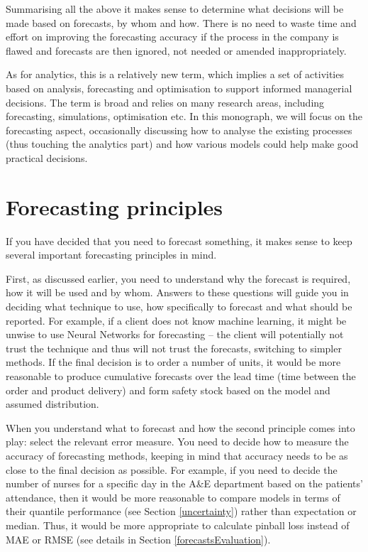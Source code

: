 \documentclass[
]{book}
\theoremstyle{definition}
\theoremstyle{definition}
\theoremstyle{definition}
\theoremstyle{definition}
\theoremstyle{remark}
\begin{document}
Summarising all the above it makes sense to determine what decisions will be made based on forecasts, by whom and how. There is no need to waste time and effort on improving the forecasting accuracy if the process in the company is flawed and forecasts are then ignored, not needed or amended inappropriately.

As for analytics, this is a relatively new term, which implies a set of activities based on analysis, forecasting and optimisation to support informed managerial decisions. The term is broad and relies on many research areas, including forecasting, simulations, optimisation etc. In this monograph, we will focus on the forecasting aspect, occasionally discussing how to analyse the existing processes (thus touching the analytics part) and how various models could help make good practical decisions.

\hypertarget{forecastingPrinciples}{%
\section{Forecasting principles}\label{forecastingPrinciples}}

If you have decided that you need to forecast something, it makes sense to keep several important forecasting principles in mind.

First, as discussed earlier, you need to understand why the forecast is required, how it will be used and by whom. Answers to these questions will guide you in deciding what technique to use, how specifically to forecast and what should be reported. For example, if a client does not know machine learning, it might be unwise to use Neural Networks for forecasting -- the client will potentially not trust the technique and thus will not trust the forecasts, switching to simpler methods. If the final decision is to order a number of units, it would be more reasonable to produce cumulative forecasts over the lead time (time between the order and product delivery) and form safety stock based on the model and assumed distribution.

When you understand what to forecast and how the second principle comes into play: select the relevant error measure. You need to decide how to measure the accuracy of forecasting methods, keeping in mind that accuracy needs to be as close to the final decision as possible. For example, if you need to decide the number of nurses for a specific day in the A\&E department based on the patients' attendance, then it would be more reasonable to compare models in terms of their quantile performance (see Section \ref{uncertainty}) rather than expectation or median. Thus, it would be more appropriate to calculate pinball loss instead of MAE or RMSE (see details in Section \ref{forecastsEvaluation}).
\end{document}
